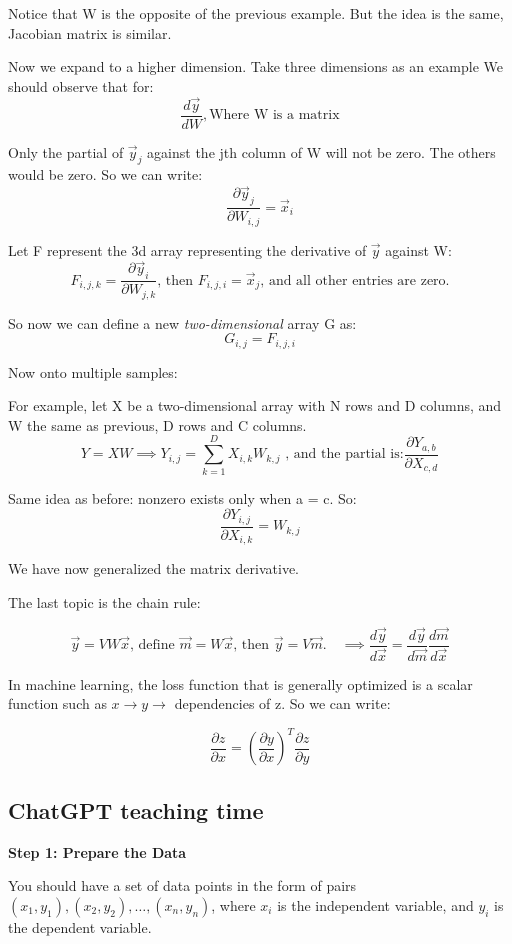 \documentclass[letterpaper,12pt]{article}
\begin{document}
Notice that W is the opposite of the previous example. But the idea is the
same, Jacobian matrix is similar.

Now we expand to a higher dimension. Take three dimensions as an example We
should observe that for:
\[\frac{d\vec{y}}{dW},\text{Where W is a matrix}\]

Only the partial of $\vec{y}_j$ against the jth column of W will not be zero.
The others would be zero. So we can write:
\[\frac{\partial\vec{y}_j}{\partial W_{i,j}}=\vec{x}_i\]

Let F represent the 3d array representing the derivative of $\vec{y}$ against
W:
\[
    F_{i,j,k}= \frac{\partial\vec{y}_i}{\partial W_{j,k}}\text{, then } F_{i,j,i}=\vec{x}_j\text{, and all other entries are zero.}
\]

So now we can define a new \textit{two-dimensional} array G as:
\[G_{i,j}=F_{i,j,i}\]

Now onto multiple samples:

For example, let X be a two-dimensional array with N rows and D columns, and W
the same as previous, D rows and C columns.
\[Y=XW \implies Y_{i,j}=\sum_{k=1}^{D}X_{i,k}W_{k,j}\text{ , and the partial is:} \frac{\partial Y_{a,b}}{\partial X_{c,d}}\]

Same idea as before: nonzero exists only when a = c. So:
\[
    \frac{\partial Y_{i,j}}{\partial X_{i,k}} = W_{k,j}
\]

We have now generalized the matrix derivative.

The last topic is the chain rule:

\[
    \vec{y}=VW\vec{x}\text{, define }\vec{m}=W\vec{x}\text{, then }\vec{y}=V\vec{m}.\quad \implies \frac{d\vec{y}}{d\vec{x}}= \frac{d\vec{y}}{d\vec{m}}\frac{d\vec{m}}{d\vec{x}}
\]

In machine learning, the loss function that is generally optimized is a scalar
function such as $x\rightarrow y \rightarrow $ dependencies of z. So we can
write:

\[\frac{\partial z}{\partial x} = {(\frac{\partial y}{\partial x})}^T \frac{\partial z}{\partial y}\]

\subsection{ChatGPT teaching time}

\textbf{Step 1: Prepare the Data}

You should have a set of data points in the form of pairs $(x_1, y_1), (x_2,
    y_2), \ldots, (x_n, y_n)$, where $x_i$ is the independent variable, and $y_i$
is the dependent variable.
\end{document}
